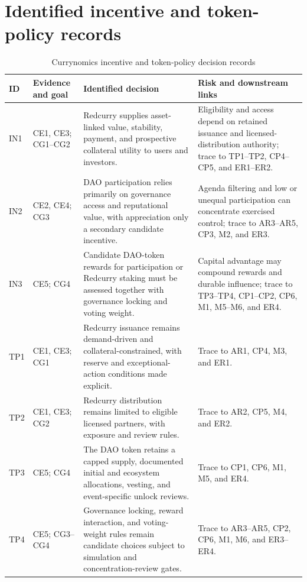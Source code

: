 \documentclass[10pt]{article}
\begin{document}
\section*{Identified incentive and token-policy records}
\begin{table}[h]
\caption{Currynomics incentive and token-policy decision records}
\centering
\small
\begin{tabularx}{\linewidth}{@{}p{.07\linewidth}p{.17\linewidth}YY@{}}
\toprule
ID & Evidence and goal & Identified decision & Risk and downstream links \\
\midrule
IN1 & CE1, CE3; CG1--CG2 & Redcurry supplies asset-linked value, stability,
payment, and prospective collateral utility to users and investors. & Eligibility
and access depend on retained issuance and licensed-distribution authority;
trace to TP1--TP2, CP4--CP5, and ER1--ER2. \\
IN2 & CE2, CE4; CG3 & DAO participation relies primarily on governance access
and reputational value, with appreciation only a secondary candidate incentive.
& Agenda filtering and low or unequal participation can concentrate exercised
control; trace to AR3--AR5, CP3, M2, and ER3. \\
IN3 & CE5; CG4 & Candidate DAO-token rewards for participation or Redcurry
staking must be assessed together with governance locking and voting weight. &
Capital advantage may compound rewards and durable influence; trace to TP3--TP4,
CP1--CP2, CP6, M1, M5--M6, and ER4. \\
TP1 & CE1, CE3; CG1 & Redcurry issuance remains demand-driven and
collateral-constrained, with reserve and exceptional-action conditions made
explicit. & Trace to AR1, CP4, M3, and ER1. \\
TP2 & CE1, CE3; CG2 & Redcurry distribution remains limited to eligible
licensed partners, with exposure and review rules. & Trace to AR2, CP5, M4, and
ER2. \\
TP3 & CE5; CG4 & The DAO token retains a capped supply, documented initial and
ecosystem allocations, vesting, and event-specific unlock reviews. & Trace to
CP1, CP6, M1, M5, and ER4. \\
TP4 & CE5; CG3--CG4 & Governance locking, reward interaction, and voting-weight
rules remain candidate choices subject to simulation and concentration-review
gates. & Trace to AR3--AR5, CP2, CP6, M1, M6, and ER3--ER4. \\
\bottomrule
\end{tabularx}
\end{table}
\end{document}
